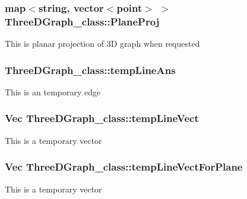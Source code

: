\subsubsection[{\texorpdfstring{Plane\+Proj}{PlaneProj}}]{\setlength{\rightskip}{0pt plus 5cm}map$<$string, vector$<${\bf point}$>$ $>$ Three\+D\+Graph\+\_\+class\+::\+Plane\+Proj}\hypertarget{classThreeDGraph__class_ad800b572d58a46cbd5b4139b3ec7b173}{}\label{classThreeDGraph__class_ad800b572d58a46cbd5b4139b3ec7b173}
This is planar projection of 3D graph when requested 
\subsubsection[{\texorpdfstring{temp\+Line\+Ans}{tempLineAns}}]{ Three\+D\+Graph\+\_\+class\+::temp\+Line\+Ans}\hypertarget{classThreeDGraph__class_aa7a987df28f93f04fa0021d56a364a98}{}\label{classThreeDGraph__class_aa7a987df28f93f04fa0021d56a364a98}
This is an temporary edge 
\subsubsection[{\texorpdfstring{temp\+Line\+Vect}{tempLineVect}}]{\setlength{\rightskip}{0pt plus 5cm}Vec Three\+D\+Graph\+\_\+class\+::temp\+Line\+Vect}\hypertarget{classThreeDGraph__class_a48d310a18f7602769320d2dae4445d25}{}\label{classThreeDGraph__class_a48d310a18f7602769320d2dae4445d25}
This is a temporary vector 
\subsubsection[{\texorpdfstring{temp\+Line\+Vect\+For\+Plane}{tempLineVectForPlane}}]{\setlength{\rightskip}{0pt plus 5cm}Vec Three\+D\+Graph\+\_\+class\+::temp\+Line\+Vect\+For\+Plane}\hypertarget{classThreeDGraph__class_a68fb902385d303dcfcd1d9b0afd935cb}{}\label{classThreeDGraph__class_a68fb902385d303dcfcd1d9b0afd935cb}
This is a temporary vector 
